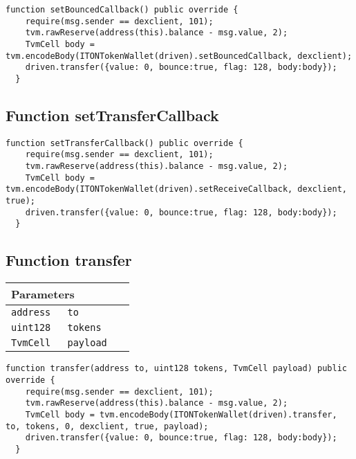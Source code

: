 \vspace{2cm}

\begin{lstlisting}[firstnumber=95]
  function setBouncedCallback() public override {
    require(msg.sender == dexclient, 101);
    tvm.rawReserve(address(this).balance - msg.value, 2);
    TvmCell body = tvm.encodeBody(ITONTokenWallet(driven).setBouncedCallback, dexclient);
    driven.transfer({value: 0, bounce:true, flag: 128, body:body});
  }
\end{lstlisting}

\subsection{Function setTransferCallback}

\vspace{2cm}

\begin{lstlisting}[firstnumber=87]
  function setTransferCallback() public override {
    require(msg.sender == dexclient, 101);
    tvm.rawReserve(address(this).balance - msg.value, 2);
    TvmCell body = tvm.encodeBody(ITONTokenWallet(driven).setReceiveCallback, dexclient, true);
    driven.transfer({value: 0, bounce:true, flag: 128, body:body});
  }
\end{lstlisting}

\subsection{Function transfer}


\ifsoltables
\noindent\begin{tabular}{|l|l|p{5cm}|}\hline
\multicolumn{3}{|l|}{\bf Parameters}\\\hline
\tt address & \tt to &\\\hline
\tt uint128 & \tt tokens &\\\hline
\tt TvmCell & \tt payload &\\\hline
\end{tabular}
\fi

\vspace{2cm}

\begin{lstlisting}[firstnumber=108]
  function transfer(address to, uint128 tokens, TvmCell payload) public override {
    require(msg.sender == dexclient, 101);
    tvm.rawReserve(address(this).balance - msg.value, 2);
    TvmCell body = tvm.encodeBody(ITONTokenWallet(driven).transfer, to, tokens, 0, dexclient, true, payload);
    driven.transfer({value: 0, bounce:true, flag: 128, body:body});
  }
\end{lstlisting}

